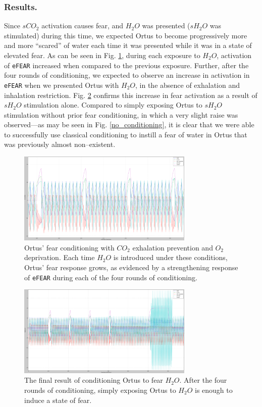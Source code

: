 \documentclass[letterpaper]{article}
\begin{document}
\subsubsection{Results.} Since $sCO_2$ activation causes fear, and $H_2O$ was presented ($sH_2O$ was stimulated) during this time, we expected Ortus to become progressively more and more ``scared'' of water each time it was presented while it was in a state of elevated fear.
As can be seen in Fig. \ref{conditioning}, during each exposure to $H_2O$, activation of \texttt{eFEAR} increased when compared to the previous exposure.
Further, after the four rounds of conditioning, we expected to observe an increase in activation in \texttt{eFEAR} when we presented Ortus with $H_2O$, in the absence of exhalation and inhalation restriction. Fig. \ref{conditioned} confirms this increase in fear activation as a result of $sH_2O$ stimulation alone. Compared to simply exposing Ortus to $sH_2O$ stimulation without prior fear conditioning, in which a very slight raise was observed---as may be seen in Fig. \ref{no_conditioning}, it is clear that we were able to successfully use classical conditioning to instill a fear of water in Ortus that was previously almost non--existent. 

\begin{figure}
\begin{center}
\includegraphics[width=3.3in]{images/conditioning_small.png}
\caption{Ortus' fear conditioning with $CO_2$ exhalation prevention and $O_2$ deprivation. Each time $H_2O$ is introduced under these conditions, Ortus' fear response grows, as evidenced by a strengthening response of \texttt{eFEAR} during each of the four rounds of conditioning.}
\label{conditioning}
\end{center}
\end{figure}

\begin{figure}
\begin{center}
\includegraphics[width=3.3in]{images/conditioned_small.png}
\caption{The final result of conditioning Ortus to fear $H_2O$. After the four rounds of conditioning, simply exposing Ortus to $H_2O$ is enough to induce a state of fear.}
\label{conditioned}
\end{center}
\end{figure}
\end{document}
